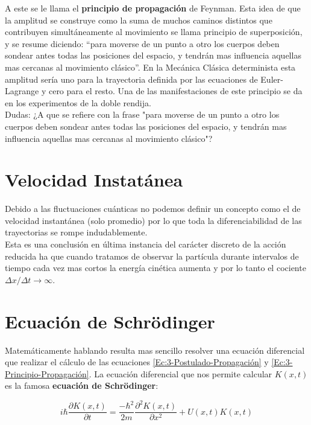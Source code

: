 \documentclass[12pt]{article}
\newcommand{\parciales}[2]{\frac{\partial #1}{\partial #2}}
\begin{document}
A este se le llama el \textbf{principio de propagación} de Feynman. Esta idea de que la amplitud se construye como la suma de muchos caminos distintos que contribuyen simultáneamente al movimiento se llama principio de superposición, y se resume diciendo: ``para moverse de un punto a otro los cuerpos deben sondear antes  todas las posiciones del espacio, y tendrán mas influencia aquellas mas cercanas al movimiento clásico''. En la Mecánica Clásica determinista esta amplitud sería uno para la trayectoria definida por las ecuaciones de Euler-Lagrange y cero para el resto. Una de las manifestaciones de este principio se da en los experimentos de la doble rendija. \\




Dudas: ¿A que se refiere con la frase "para moverse de un punto a otro los cuerpos deben sondear antes  todas las posiciones del espacio, y tendrán mas influencia aquellas mas cercanas al movimiento clásico"?

\section{Velocidad Instatánea}

Debido a las fluctuaciones cuánticas no podemos definir un concepto como el de velocidad instantánea (solo promedio) por lo que toda la diferenciabilidad de las trayectorias se rompe indudablemente. \\

Esta es una conclusión en última instancia del carácter discreto de la acción reducida ha que cuando tratamos de observar la partícula durante intervalos de tiempo cada vez mas cortos la energía cinética aumenta y por lo tanto el cociente $\Delta x / \Delta t \rightarrow \infty$. 

\section{Ecuación de Schrödinger}

Matemáticamente hablando resulta mas sencillo resolver una ecuación diferencial que realizar el cálculo de las ecuaciones \ref{Ec:3-Postulado-Propagación} y \ref{Ec:3-Principio-Propagación}. La ecuación diferencial que nos permite calcular $K(x,t)$ es la famosa \textbf{ecuación de Schrödinger}:

\begin{equation}
i \hbar \parciales{K(x,t)}{t}  = \dfrac{- \hbar^2}{2 m} \parciales{^2 K(x,t)}{x^2} + U(x,t)K(x,t)
\end{equation}
\end{document}
